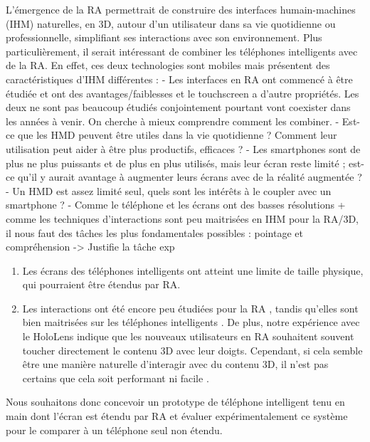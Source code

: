 L'émergence de la RA permettrait de construire des interfaces humain-machines (IHM) naturelles, en 3D, autour d'un utilisateur dans sa vie quotidienne ou professionnelle, simplifiant ses interactions avec son environnement. Plus particulièrement, il serait intéressant de combiner les téléphones intelligents avec de la RA. En effet, ces deux technologies sont mobiles mais présentent des caractéristiques d'IHM différentes :
- Les interfaces en RA ont commencé à être étudiée et ont des avantages/faiblesses et le touchscreen a d'autre propriétés. Les deux ne sont pas beaucoup étudiés conjointement pourtant vont coexister dans les années à venir. On cherche à mieux comprendre comment les combiner.
- Est-ce que les HMD peuvent être utiles dans la vie quotidienne ? Comment leur utilisation peut aider à être plus productifs, efficaces ?
- Les smartphones sont de plus ne plus puissants et de plus en plus utilisés, mais leur écran reste limité ; est-ce qu'il y aurait avantage à augmenter leurs écrans avec de la réalité augmentée ?
- Un HMD est assez limité seul, quels sont les intérêts à le coupler avec un smartphone ?
- Comme le téléphone et les écrans ont des basses résolutions + comme les techniques d'interactions sont peu maitrisées en IHM pour la RA/3D, il nous faut des tâches les plus fondamentales possibles : pointage et  compréhension -> Justifie la tâche exp
\begin{enumerate}
  \item Les écrans des téléphones intelligents ont atteint une limite de taille physique, qui pourraient être étendus par RA.
  \item Les interactions ont été encore peu étudiées pour la RA \citep{Piumsomboon2013}, tandis qu'elles sont bien maitrisées sur les téléphones intelligents \citep{Wobbrock2009}. De plus, notre expérience avec le HoloLens indique que les nouveaux utilisateurs en RA souhaitent souvent toucher directement le contenu 3D avec leur doigts. Cependant, si cela semble être une manière naturelle d'interagir avec du contenu 3D, il n'est pas certains que cela soit performant ni facile \citep{ChanKaoChenEtAl2010}.
\end{enumerate}
Nous souhaitons donc concevoir un prototype de téléphone intelligent tenu en main dont l'écran est étendu par RA et évaluer expérimentalement ce système pour le comparer à un téléphone seul non étendu.

